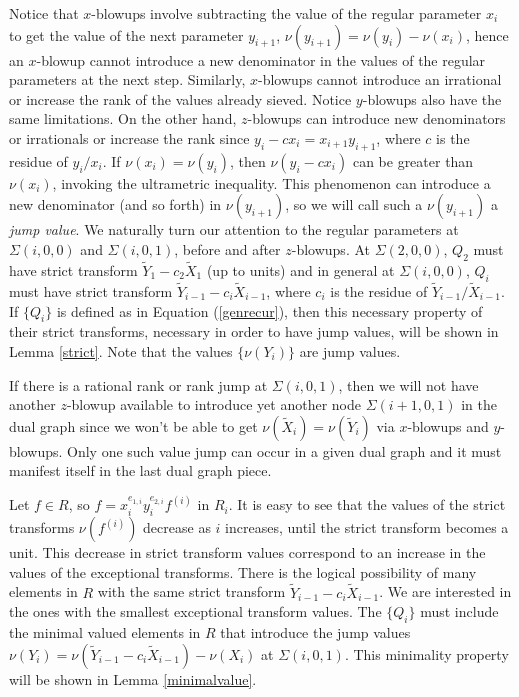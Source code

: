 \documentclass[11pt]{amsart}
\theoremstyle{definition}
\begin{document}
{Notice that $x$-blowups involve subtracting the value of the regular parameter $x_i$ to get the value of the next parameter $y_{i+1}$, $\nu(y_{i+1})=\nu(y_i)-\nu(x_i)$, hence an $x$-blowup cannot introduce a new denominator in the values of the regular parameters at the next step. Similarly, $x$-blowups cannot introduce an irrational or increase the rank of the values already sieved. Notice $y$-blowups also have the same limitations. On the other hand, $z$-blowups can introduce new denominators or irrationals or increase the rank since $y_i-cx_i=x_{i+1}y_{i+1}$, where $c$ is the residue of $y_i/x_i$. If $\nu(x_i)=\nu(y_i)$, then $\nu(y_i-cx_i)$ can be greater than $\nu(x_i)$, invoking the ultrametric inequality. This phenomenon can introduce a new denominator (and so forth) in $\nu(y_{i+1})$, so we will call such a $\nu(y_{i+1})$ a {\it jump value}. We naturally turn our attention to the regular parameters at $\Sigma(i,0,0)$ and $\Sigma(i,0,1)$, before and after $z$-blowups. At $\Sigma(2,0,0)$, $Q_2$ must have strict transform $\tilde Y_1-c_2\tilde X_1$ (up to units) and in general at $\Sigma(i,0,0)$, $Q_i$ must have strict transform $\tilde Y_{i-1}-c_i\tilde X_{i-1}$, where $c_i$ is the residue of $\tilde Y_{i-1}/\tilde X_{i-1}$. If $\{Q_i\}$ is defined as in Equation (\ref{genrecur}), then this necessary property of their strict transforms, necessary in order to have jump values, will be shown in Lemma \ref{strict}. Note that the values $\{\nu(Y_i)\}$ are jump values.

If there is a rational rank or rank jump at $\Sigma(i,0,1)$, then we will not have another $z$-blowup available to introduce yet another node $\Sigma(i+1,0,1)$ in the dual graph since we won't be able to get $\nu(\tilde X_i)=\nu(\tilde Y_i)$ via $x$-blowups and $y$-blowups. Only one such value jump can occur in a given dual graph and it must manifest itself in the last dual graph piece.

Let $f\in R$, so $\displaystyle f=x_i^{e_{1,i}}y_i^{e_{2,i}}f^{(i)}$ in $R_i$. It is easy to see that the values of the strict transforms $\nu(f^{(i)})$ decrease as $i$ increases, until the strict transform becomes a unit. This decrease in strict transform values correspond to an increase in the values of the exceptional transforms. There is the logical possibility of many elements in $R$ with the same strict transform $\displaystyle \tilde Y_{i-1} - c_i \tilde X_{i-1}$. We are interested in the ones with the smallest exceptional transform values. The $\{Q_i\}$ must include the minimal valued elements in $R$ that introduce the jump values $\nu(Y_i)=\nu(\tilde Y_{i-1}-c_i\tilde X_{i-1})-\nu(X_i)$ at $\Sigma(i,0,1)$. This minimality property will be shown in Lemma \ref{minimalvalue}.

}
\end{document}
